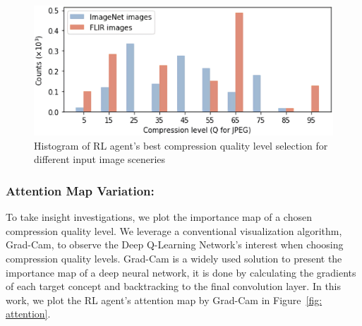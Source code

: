 \begin{figure}[htb]
    \includegraphics[width=\linewidth]{figures/dataset_change.eps}
    \caption{Histogram of RL agent's best compression quality level selection for different input image sceneries}
    \label{fig: dataset_change}
\end{figure}

\subsubsection{\textbf{Attention Map Variation:}}
\label{subsec: attention map}

To take insight investigations, we plot the importance map of a chosen compression quality level. We leverage a conventional visualization algorithm, Grad-Cam, to observe the Deep Q-Learning Network's interest when choosing compression quality levels. Grad-Cam is a widely used solution to present the importance map of a deep neural network, it is done by calculating the gradients of each target concept and backtracking to the final convolution layer. In this work, we plot the RL agent's attention map by Grad-Cam in Figure~\ref{fig: attention}. %

